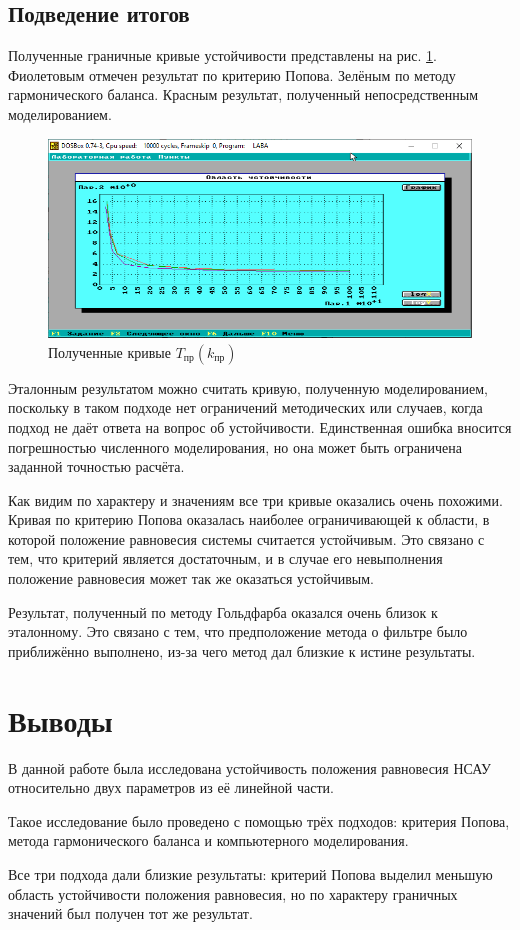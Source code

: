 	\subsection{Подведение итогов}
	
	Полученные граничные кривые устойчивости представлены на рис. \ref{itog}. Фиолетовым отмечен результат по критерию Попова. Зелёным по методу гармонического баланса. Красным результат, полученный непосредственным моделированием.
	
	\begin{figure}[h]
		\centering\includegraphics[width=.9\textwidth]{png/Итог.png}
		\caption{Полученные кривые $T_\text{пр}(k_\text{пр})$}
		\label{itog}
	\end{figure}
	
	Эталонным результатом можно считать кривую, полученную моделированием, поскольку в таком подходе нет ограничений методических или случаев, когда подход не даёт ответа на вопрос об устойчивости. Единственная ошибка вносится погрешностью численного моделирования, но она может быть ограничена заданной точностью расчёта.
	
	Как видим по характеру и значениям все три кривые оказались очень похожими. Кривая по критерию Попова оказалась наиболее ограничивающей к области, в которой положение равновесия системы считается устойчивым. Это связано с тем, что критерий является достаточным, и в случае его невыполнения положение равновесия может так же оказаться устойчивым.
	
	Результат, полученный по методу Гольдфарба оказался очень близок к эталонному. Это связано с тем, что предположение метода о фильтре было приближённо выполнено, из-за чего метод дал близкие к истине результаты.
	
	\section{Выводы}
	
	В данной работе была исследована устойчивость положения равновесия НСАУ относительно двух параметров из её линейной части.
	
	Такое исследование было проведено с помощью трёх подходов: критерия Попова, метода гармонического баланса и компьютерного моделирования.
	
	Все три подхода дали близкие результаты: критерий Попова выделил меньшую область устойчивости положения равновесия, но по характеру граничных значений был получен тот же результат.


